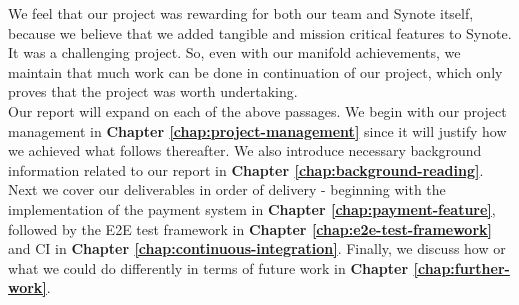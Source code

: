 We feel that our project was rewarding for both our team and Synote itself, because we believe that we added tangible and mission critical features to Synote. It was a challenging project. So, even with our manifold achievements, we maintain that much work can be done in continuation of our project, which only proves that the project was worth undertaking.\\

Our report will expand on each of the above passages. We begin with our project management in \textbf{Chapter \ref{chap:project-management}} since it will justify how we achieved what follows thereafter. We also introduce necessary background information related to our report in \textbf{Chapter \ref{chap:background-reading}}. Next we cover our deliverables in order of delivery - beginning with the implementation of the payment system in \textbf{Chapter \ref{chap:payment-feature}}, followed by the E2E test framework in \textbf{Chapter \ref{chap:e2e-test-framework}} and CI in \textbf{Chapter \ref{chap:continuous-integration}}. Finally, we discuss how or what we could do differently in terms of future work in \textbf{Chapter \ref{chap:further-work}}. 
